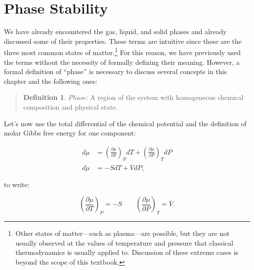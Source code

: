 \documentclass[
  9pt,
]{extbook}
\theoremstyle{definition}
\newtheorem{definition}{Definition}[chapter]
\theoremstyle{definition}
\theoremstyle{definition}
\theoremstyle{remark}
\begin{document}
\hypertarget{phase-stability}{%
\section{Phase Stability}\label{phase-stability}}

We have already encountered the gas, liquid, and solid phases and already discussed some of their properties. These terms are intuitive since these are the three most common states of matter.\footnote{Other states of matter---such as plasma---are possible, but they are not usually observed at the values of temperature and pressure that classical thermodynamics is usually applied to. Discussion of these extreme cases is beyond the scope of this textbook.} For this reason, we have previously used the terms without the necessity of formally defining their meaning. However, a formal definition of ``phase'' is necessary to discuss several concepts in this chapter and the following ones:

\begin{quote}
\begin{definition}
\protect\hypertarget{def:phasedef}{}{\label{def:phasedef} }\emph{Phase:} A region of the system with homogeneous chemical composition and physical state.
\end{definition}
\end{quote}

Let's now use the total differential of the chemical potential and the definition of molar Gibbs free energy for one component:

\begin{equation}
\begin{aligned}
d\mu &= \left( \frac{\partial \mu}{\partial T} \right)_P dT + \left( \frac{\partial \mu}{\partial P} \right)_T dP \\
d\mu &= -SdT+\overline{V}dP,
\end{aligned}
\label{eq:muequal1}
\end{equation}

to write:

\begin{equation}
\left( \frac{\partial \mu}{\partial T} \right)_P=-S \qquad \left( \frac{\partial \mu}{\partial P} \right)_T =\overline{V}.
\label{eq:muequal2}
\end{equation}
\end{document}
